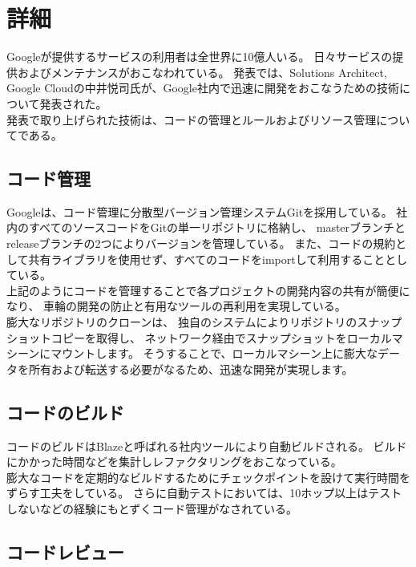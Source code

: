 \section*{詳細}

Googleが提供するサービスの利用者は全世界に10億人いる。
日々サービスの提供およびメンテナンスがおこなわれている。
発表では、Solutions Architect, Google Cloudの中井悦司氏が、Google社内で迅速に開発をおこなうための技術について発表された。\\

発表で取り上げられた技術は、コードの管理とルールおよびリソース管理についてである。

\subsection*{コード管理}

Googleは、コード管理に分散型バージョン管理システムGitを採用している。
社内のすべてのソースコードをGitの単一リポジトリに格納し、
masterブランチとreleaseブランチの2つによりバージョンを管理している。
また、コードの規約として共有ライブラリを使用せず、すべてのコードをimportして利用することとしている。\\

上記のようにコードを管理することで各プロジェクトの開発内容の共有が簡便になり、
車輪の開発の防止と有用なツールの再利用を実現している。\\

膨大なリポジトリのクローンは、
独自のシステムによりリポジトリのスナップショットコピーを取得し、
ネットワーク経由でスナップショットをローカルマシーンにマウントします。
そうすることで、ローカルマシーン上に膨大なデータを所有および転送する必要がなるため、迅速な開発が実現します。\\


\subsection*{コードのビルド}

コードのビルドはBlazeと呼ばれる社内ツールにより自動ビルドされる。
ビルドにかかった時間などを集計しレファクタリングをおこなっている。\\

膨大なコードを定期的なビルドするためにチェックポイントを設けて実行時間をずらす工夫をしている。
さらに自動テストにおいては、10ホップ以上はテストしないなどの経験にもとずくコード管理がなされている。

\subsection*{コードレビュー}


